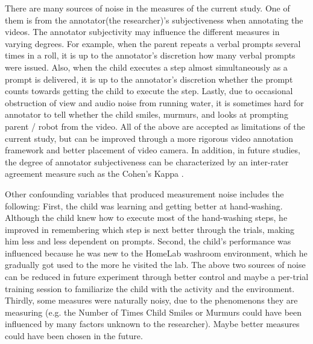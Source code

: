 \documentclass{ut-thesis}
\begin{document}
There are many sources of noise in the measures of the current study.  One of them is from the annotator(the researcher)'s subjectiveness when annotating the videos.  The annotator subjectivity may influence the different measures in varying degrees.  For example, when the parent repeats a verbal prompts several times in a roll, it is up to the annotator's discretion how many verbal prompts were issued.  Also, when the child executes a step almost simultaneously as a prompt is delivered, it is up to the annotator's discretion whether the prompt counts towards getting the child to execute the step.  Lastly, due to occasional obstruction of view and audio noise from running water, it is sometimes hard for annotator to tell whether the child smiles, murmurs, and looks at prompting parent / robot from the video.  All of the above are accepted as limitations of the current study, but can be improved through a more rigorous video annotation framework and better placement of video camera.  In addition, in future studies, the degree of annotator subjectiveness can be characterized by an inter-rater agreement measure such as the Cohen's Kappa \cite{volkmar2005handbook}.

Other confounding variables that produced measurement noise includes the following: First, the child was learning and getting better at hand-washing.  Although the child knew how to execute most of the hand-washing steps, he improved in remembering which step is next better through the trials, making him less and less dependent on prompts.  Second, the child's performance was influenced because he was new to the HomeLab washroom environment, which he gradually got used to the more he visited the lab.  The above two sources of noise can be reduced in future experiment through better control and maybe a per-trial training session to familiarize the child with the activity and the environment.  Thirdly, some measures were naturally noisy, due to the phenomenons they are measuring (e.g. the Number of Times Child Smiles or Murmurs could have been influenced by many factors unknown to the researcher).  Maybe better measures could have been chosen in the future.
\end{document}
